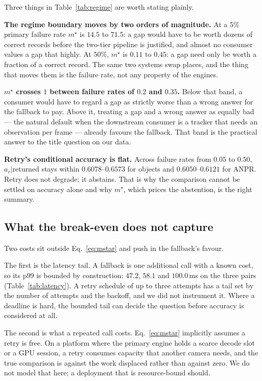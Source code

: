 \documentclass[11pt,a4paper]{article}
\begin{document}
Three things in Table~\ref{tab:regime} are worth stating plainly.

\textbf{The regime boundary moves by two orders of magnitude.} At a $5\%$ primary
failure rate $m^\star$ is $14.5$ to $71.5$: a gap would have to be worth dozens of
correct records before the two-tier pipeline is justified, and almost no consumer
values a gap that highly. At $50\%$, $m^\star$ is $0.11$ to $0.45$: a gap need only
be worth a fraction of a correct record. The same two systems swap places, and the
thing that moves them is the failure rate, not any property of the engines.

\textbf{$m^\star$ crosses $1$ between failure rates of $0.2$ and $0.35$.} Below
that band, a consumer would have to regard a gap as strictly worse than a wrong
answer for the fallback to pay. Above it, treating a gap and a wrong answer as
equally bad --- the natural default when the downstream consumer is a tracker that
needs an observation per frame --- already favours the fallback. That band is the
practical answer to the title question on our data.

\textbf{Retry's conditional accuracy is flat.} Across failure rates from $0.05$ to
$0.50$, $a_r|$returned stays within $0.6078$--$0.6573$ for objects and
$0.6050$--$0.6121$ for ANPR. Retry does not degrade; it abstains. That is why the
comparison cannot be settled on accuracy alone and why $m^\star$, which prices the
abstention, is the right summary.

\subsection{What the break-even does not capture}

Two costs sit outside Eq.~\ref{eq:mstar} and push in the fallback's favour.

The first is the latency tail. A fallback is one additional call with a known
cost, so its p99 is bounded by construction: $47.2$, $58.1$ and $100.0$\,ms on the
three pairs (Table~\ref{tab:latency}). A retry schedule of up to three attempts has
a tail set by the number of attempts and the backoff, and we did not instrument it.
Where a deadline is hard, the bounded tail can decide the question before accuracy
is considered at all.

The second is what a repeated call costs. Eq.~\ref{eq:mstar} implicitly assumes a
retry is free. On a platform where the primary engine holds a scarce decode slot or
a GPU session, a retry consumes capacity that another camera needs, and the true
comparison is against the work displaced rather than against zero. We do not model
that here; a deployment that is resource-bound should.
\end{document}
